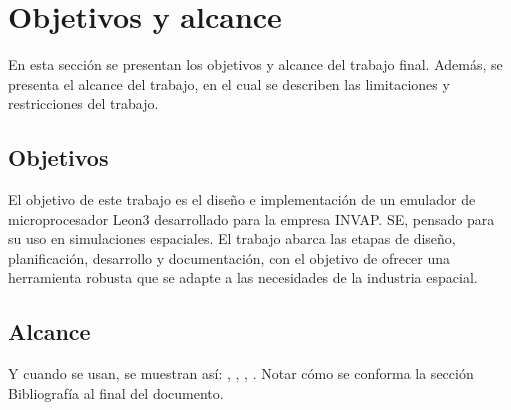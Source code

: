 \section{Objetivos y alcance}
\label{sec:objetivos_alcance}

En esta sección se presentan los objetivos y alcance del trabajo final. Además, se presenta el alcance del trabajo, en el cual se describen las limitaciones y restricciones del trabajo.


\subsection{Objetivos}
\label{subsec:objetivos}

El objetivo de este trabajo es el diseño e implementación de un emulador de microprocesador Leon3 desarrollado para la empresa INVAP. SE, pensado para su uso en simulaciones espaciales. El trabajo abarca las etapas de diseño, planificación, desarrollo y documentación, con el objetivo de ofrecer una herramienta robusta que se adapte a las necesidades de la industria espacial.

\subsection{Alcance}
\label{subsec:alcance}

Y cuando se usan, se muestran así: \citep{ARTICLE:1}, \citep{BOOK:1}, \citep{BOOK:2}, \citep{WEBSITE:1}.  Notar cómo se conforma la sección Bibliografía al final del documento.
